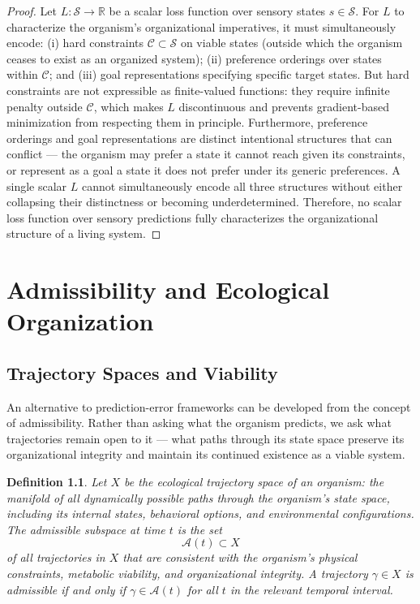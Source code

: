 \documentclass[12pt,a4paper]{report}
\theoremstyle{flyxion}
\newtheorem{definition}[theorem]{Definition}
\begin{document}
\begin{proof}
Let $L : \mathcal{S} \rightarrow \mathbb{R}$ be a scalar loss function over sensory states $s \in \mathcal{S}$. For $L$ to characterize the organism's organizational imperatives, it must simultaneously encode: (i) hard constraints $\mathcal{C} \subset \mathcal{S}$ on viable states (outside which the organism ceases to exist as an organized system); (ii) preference orderings over states within $\mathcal{C}$; and (iii) goal representations specifying specific target states. But hard constraints are not expressible as finite-valued functions: they require infinite penalty outside $\mathcal{C}$, which makes $L$ discontinuous and prevents gradient-based minimization from respecting them in principle. Furthermore, preference orderings and goal representations are distinct intentional structures that can conflict --- the organism may prefer a state it cannot reach given its constraints, or represent as a goal a state it does not prefer under its generic preferences. A single scalar $L$ cannot simultaneously encode all three structures without either collapsing their distinctness or becoming underdetermined. Therefore, no scalar loss function over sensory predictions fully characterizes the organizational structure of a living system.
\end{proof}

\chapter{Admissibility and Ecological Organization}

\section{Trajectory Spaces and Viability}

An alternative to prediction-error frameworks can be developed from the concept of admissibility. Rather than asking what the organism predicts, we ask what trajectories remain open to it --- what paths through its state space preserve its organizational integrity and maintain its continued existence as a viable system.

\begin{definition}
Let $X$ be the ecological trajectory space of an organism: the manifold of all dynamically possible paths through the organism's state space, including its internal states, behavioral options, and environmental configurations. The \emph{admissible subspace} at time $t$ is the set
\[
\mathcal{A}(t) \subset X
\]
of all trajectories in $X$ that are consistent with the organism's physical constraints, metabolic viability, and organizational integrity. A trajectory $\gamma \in X$ is admissible if and only if $\gamma \in \mathcal{A}(t)$ for all $t$ in the relevant temporal interval.
\end{definition}
\end{document}
